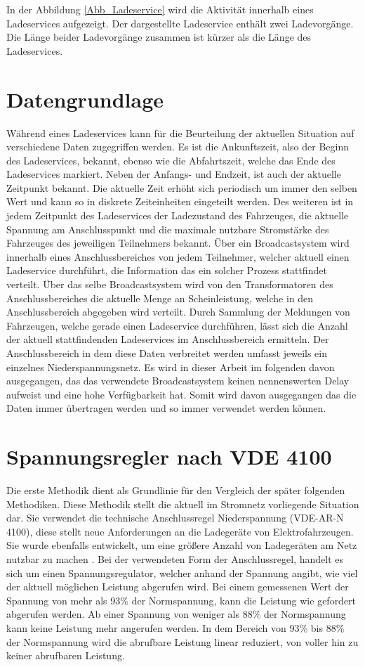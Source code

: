 In der Abbildung \ref{Abb_Ladeservice} wird die Aktivität innerhalb eines Ladeservices aufgezeigt. Der dargestellte Ladeservice enthält zwei Ladevorgänge. Die Länge beider Ladevorgänge zusammen ist kürzer als die Länge des Ladeservices.
\section{Datengrundlage}
\label{cap:background_sec:setting}
Während eines Ladeservices kann für die Beurteilung der aktuellen Situation auf verschiedene Daten zugegriffen werden. Es ist die Ankunftszeit, also der Beginn des Ladeservices, bekannt, ebenso wie die Abfahrtszeit, welche das Ende des Ladeservices markiert. Neben der Anfangs- und Endzeit, ist auch der aktuelle Zeitpunkt bekannt. Die aktuelle Zeit erhöht sich periodisch um immer den selben Wert und kann so in diskrete Zeiteinheiten eingeteilt werden. Des weiteren ist in jedem Zeitpunkt des Ladeservices der Ladezustand des Fahrzeuges, die aktuelle Spannung am Anschlusspunkt und die maximale nutzbare Stromstärke des Fahrzeuges des jeweiligen Teilnehmers bekannt. Über ein Broadcastsystem wird innerhalb eines Anschlussbereiches von jedem Teilnehmer, welcher aktuell einen Ladeservice durchführt, die Information das ein solcher Prozess stattfindet verteilt. Über das selbe Broadcastsystem wird von den Transformatoren des Anschlussbereiches die aktuelle Menge an Scheinleistung, welche in den Anschlussbereich abgegeben wird verteilt. Durch Sammlung der Meldungen von Fahrzeugen, welche gerade einen Ladeservice durchführen, lässt sich die Anzahl der aktuell stattfindenden Ladeservices im Anschlussbereich ermitteln. Der Anschlussbereich in dem diese Daten verbreitet werden umfasst jeweils ein einzelnes Niederspannungsnetz.  Es wird in dieser Arbeit im folgenden davon ausgegangen, das das verwendete Broadcastsystem keinen nennenswerten Delay aufweist und eine hohe Verfügbarkeit hat. Somit wird davon ausgegangen das die Daten immer übertragen werden und so immer verwendet werden können.

\section{Spannungsregler nach VDE 4100}
\label{capBody:VDE}
Die erste Methodik dient als Grundlinie für den Vergleich der später folgenden Methodiken. Diese Methodik stellt die aktuell im Stromnetz vorliegende Situation dar. Sie verwendet die technische Anschlussregel Niederspannung (VDE-AR-N 4100), diese stellt neue Anforderungen an die Ladegeräte von Elektrofahrzeugen. Sie wurde ebenfalls entwickelt, um eine größere Anzahl von Ladegeräten am Netz nutzbar zu machen \cite{kutter2020}. Bei der verwendeten Form der Anschlussregel, handelt es sich um einen Spannungsregulator, welcher anhand der Spannung angibt, wie viel der aktuell möglichen Leistung abgerufen wird. Bei einem gemessenen Wert der Spannung von mehr als 93\% der Normspannung, kann die Leistung wie gefordert abgerufen werden. Ab einer Spannung von weniger als 88\% der Normspannung kann keine Leistung mehr angerufen werden. In dem Bereich von 93\% bis 88\% der Normspannung wird die abrufbare Leistung linear reduziert, von voller hin zu keiner abrufbaren Leistung.

